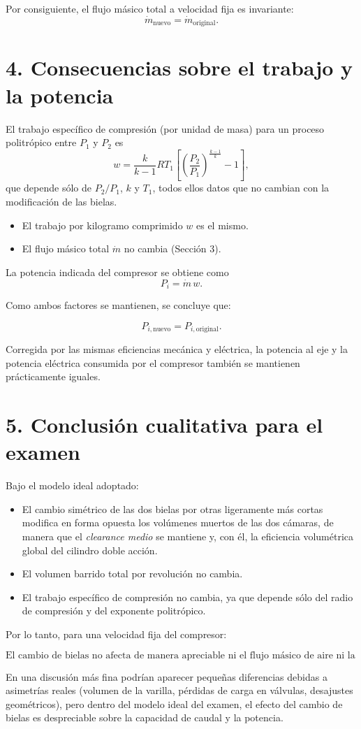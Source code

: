 \documentclass[11pt,a4paper]{article}
\begin{document}
Por consiguiente, el flujo másico total a velocidad fija es invariante:
\[
\boxed{\dot m_{\text{nuevo}} = \dot m_{\text{original}}.}
\]

\section*{4. Consecuencias sobre el trabajo y la potencia}

El trabajo específico de compresión (por unidad de masa) para un proceso
politrópico entre $P_1$ y $P_2$ es
\[
w = \frac{k}{k-1}R T_1
\left[
\left(\frac{P_2}{P_1}\right)^{\frac{k-1}{k}} - 1
\right],
\]
que depende sólo de $P_2/P_1$, $k$ y $T_1$, todos ellos datos que no cambian
con la modificación de las bielas.

\begin{itemize}
  \item El trabajo por kilogramo comprimido $w$ es el mismo.
  \item El flujo másico total $\dot m$ no cambia (Sección 3).
\end{itemize}

La potencia indicada del compresor se obtiene como
\[
P_i = \dot m\,w.
\]

Como ambos factores se mantienen, se concluye que:

\[
\boxed{P_{i,\text{nuevo}} = P_{i,\text{original}}.}
\]

Corregida por las mismas eficiencias mecánica y eléctrica, la potencia al eje
y la potencia eléctrica consumida por el compresor también se mantienen
prácticamente iguales.

\section*{5. Conclusión cualitativa para el examen}

Bajo el modelo ideal adoptado:

\begin{itemize}
  \item El cambio simétrico de las dos bielas por otras ligeramente más cortas
        modifica en forma opuesta los volúmenes muertos de las dos cámaras, de
        manera que el \emph{clearance medio} se mantiene y, con él, la
        eficiencia volumétrica global del cilindro doble acción.
  \item El volumen barrido total por revolución no cambia.
  \item El trabajo específico de compresión no cambia, ya que depende sólo del
        radio de compresión y del exponente politrópico.
\end{itemize}

Por lo tanto, para una velocidad fija del compresor:

\[
\boxed{
\text{El cambio de bielas no afecta de manera apreciable ni el flujo másico de aire ni la potencia consumida.}
}
\]

En una discusión más fina podrían aparecer pequeñas diferencias debidas a
asimetrías reales (volumen de la varilla, pérdidas de carga en válvulas,
desajustes geométricos), pero dentro del modelo ideal del examen, el efecto del
cambio de bielas es despreciable sobre la capacidad de caudal y la potencia.
\end{document}
